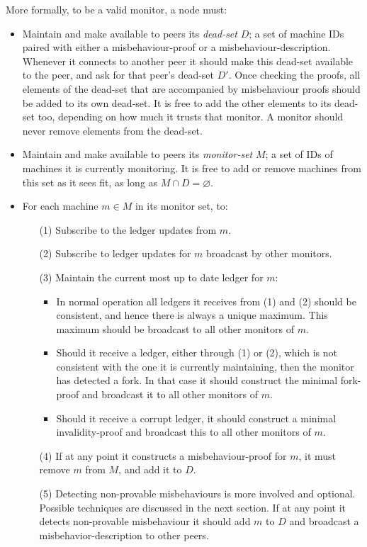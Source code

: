 \documentclass[a4paper, oneside, 10pt]{amsart}
\begin{document}
More formally, to be a valid monitor, a node must:
\begin{itemize}
\item Maintain and make available to peers its \emph{dead-set} $D$; a set of
  machine IDs paired with either a misbehaviour-proof or a
  misbehaviour-description. Whenever it connects to another peer it should make
  this dead-set available to the peer, and ask for that peer's dead-set
  $D'$. Once checking the proofs, all elements of the dead-set that are
  accompanied by misbehaviour proofs should be added to its own dead-set. It is
  free to add the other elements to its dead-set too, depending on how much it
  trusts that monitor. A monitor should never remove elements from the dead-set.
\item
  Maintain and make available to peers its \emph{monitor-set} $M$; a set of IDs
  of machines it is currently monitoring. It is free to add or remove machines
  from this set as it sees fit, as long as $M \cap D = \varnothing$.
\item
  For each machine $m \in M$ in its monitor set, to:
  \begin{itemize}
  \item[(1)] Subscribe to the ledger updates from $m$.
  \item[(2)] Subscribe to ledger updates for $m$ broadcast by other monitors.
  \item[(3)] Maintain the current most up to date ledger for $m$:
    \begin{itemize}
    \item In normal operation all ledgers it receives from (1) and (2) should be
      consistent, and hence there is always a unique maximum. This maximum
      should be broadcast to all other monitors of $m$.
    \item Should it receive a ledger, either through (1) or (2), which is not
      consistent with the one it is currently maintaining, then the monitor has
      detected a fork. In that case it should construct the minimal fork-proof
      and broadcast it to all other monitors of $m$.
    \item Should it receive a corrupt ledger, it should construct a minimal
      invalidity-proof and broadcast this to all other monitors of $m$.
    \end{itemize}
  \item[(4)] If at any point it constructs a misbehaviour-proof for $m$, it must
    remove $m$ from $M$, and add it to $D$.
  \item[(5)] Detecting non-provable misbehaviours is more involved and
    optional. Possible techniques are discussed in the next section. If at any
    point it detects non-provable misbehaviour it should add $m$ to $D$ and
    broadcast a misbehavior-description to other peers.
  \end{itemize}
\end{itemize}
\end{document}
